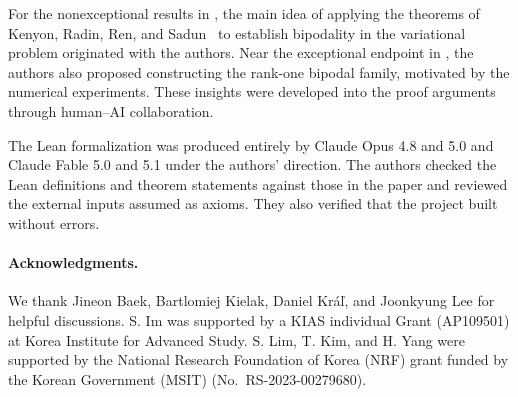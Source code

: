 \documentclass{article}
\theoremstyle{definition}
\newcommand{\1}{\mathbf 1}
\theoremstyle{plain}
\theoremstyle{definition}
\theoremstyle{definition}
\theoremstyle{definition}
\theoremstyle{definition}
\theoremstyle{definition}
\theoremstyle{definition}
\newcommand{\<}{\subseteq}
\begin{document}
For the nonexceptional results in
,
the main idea of applying the theorems of Kenyon, Radin, Ren, and
Sadun~\cite{kenyon2014entropy} to establish bipodality in the variational
problem originated with the authors.
Near the exceptional endpoint in ,
the authors also proposed constructing the rank-one bipodal family,
motivated by the numerical experiments.
These insights were developed into the proof arguments through human--AI collaboration.

The Lean formalization was produced entirely by Claude Opus 4.8 and 5.0
and Claude Fable 5.0 and 5.1 under the authors' direction.
The authors checked the Lean definitions and theorem statements against
those in the paper and reviewed the external inputs assumed as axioms.
They also verified that the project built without errors.

\paragraph{Acknowledgments.}
We thank Jineon Baek, Bartlomiej Kielak, Daniel Kr\'a\v{l}, and Joonkyung Lee for helpful discussions.
S. Im was supported by a KIAS individual Grant (AP109501) at Korea Institute for Advanced Study. 
S. Lim, T. Kim, and H. Yang were supported by the National Research Foundation of Korea (NRF)
grant funded by the Korean Government (MSIT) (No.~RS-2023-00279680).




\clearpage
\appendix

%




\end{document}
